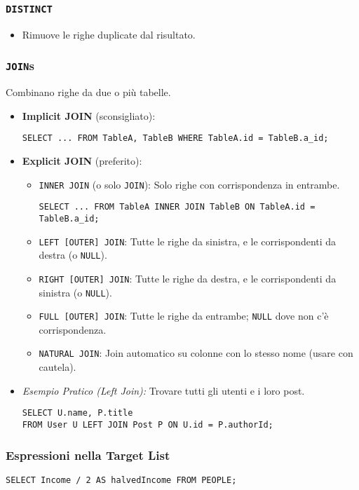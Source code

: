 	\subsubsection{\texttt{DISTINCT}}
	\begin{itemize}
		\item Rimuove le righe duplicate dal risultato.
	\end{itemize}
	
	\subsubsection{\texttt{JOIN}s}
	Combinano righe da due o più tabelle.
	\begin{itemize}
		\item \textbf{Implicit JOIN} (sconsigliato):
		\begin{verbatim}
SELECT ... FROM TableA, TableB WHERE TableA.id = TableB.a_id;
		\end{verbatim}
		\item \textbf{Explicit JOIN} (preferito):
		\begin{itemize}
			\item \texttt{INNER JOIN} (o solo \texttt{JOIN}): Solo righe con corrispondenza in entrambe.
			\begin{verbatim}
SELECT ... FROM TableA INNER JOIN TableB ON TableA.id = TableB.a_id;
			\end{verbatim}
			\item \texttt{LEFT [OUTER] JOIN}: Tutte le righe da sinistra, e le corrispondenti da destra (o \texttt{NULL}).
			\item \texttt{RIGHT [OUTER] JOIN}: Tutte le righe da destra, e le corrispondenti da sinistra (o \texttt{NULL}).
			\item \texttt{FULL [OUTER] JOIN}: Tutte le righe da entrambe; \texttt{NULL} dove non c'è corrispondenza.
			\item \texttt{NATURAL JOIN}: Join automatico su colonne con lo stesso nome (usare con cautela).
		\end{itemize}
		\item \textit{Esempio Pratico (Left Join):} Trovare tutti gli utenti e i loro post.
		\begin{verbatim}
SELECT U.name, P.title
FROM User U LEFT JOIN Post P ON U.id = P.authorId;
		\end{verbatim}
	\end{itemize}
	
	\subsubsection{Espressioni nella Target List}
	\begin{verbatim}
SELECT Income / 2 AS halvedIncome FROM PEOPLE;
	\end{verbatim}
	
